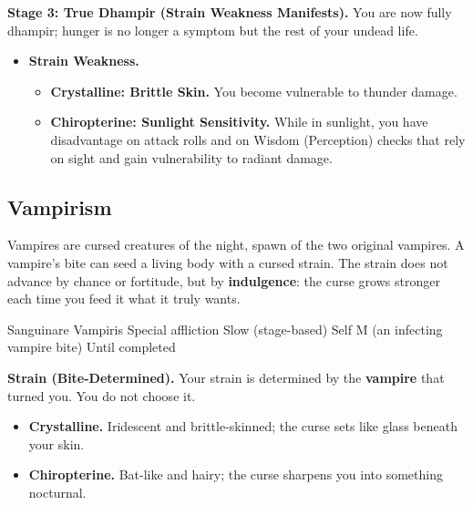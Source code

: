 \textbf{Stage 3: True Dhampir (Strain Weakness Manifests).}
You are now fully dhampir; hunger is no longer a symptom but the rest of your undead life.
\begin{itemize}
\item \textbf{Strain Weakness.}
\begin{itemize}
\item \textbf{Crystalline: Brittle Skin.} You become vulnerable to thunder damage.
\item \textbf{Chiropterine: Sunlight Sensitivity.} While in sunlight, you have disadvantage on attack rolls and on Wisdom (Perception) checks that rely on sight and gain vulnerability to radiant damage.
\end{itemize}
\end{itemize}

\subsection{Vampirism}

Vampires are cursed creatures of the night, spawn of the two original vampires. A vampire's bite can seed a living body with a cursed strain. The strain does not advance by chance or fortitude, but by \textbf{indulgence}: the curse grows stronger each time you feed it what it truly wants.

\DndSpellHeader%
  {Sanguinare Vampiris}
  {Special affliction}
  {Slow (stage-based)}
  {Self}
  {M (an infecting vampire bite)}
  {Until completed}

\textbf{Strain (Bite-Determined).} Your strain is determined by the \textbf{vampire} that turned you. You do not choose it.
\begin{itemize}
\item \textbf{Crystalline.} Iridescent and brittle-skinned; the curse sets like glass beneath your skin.
\item \textbf{Chiropterine.} Bat-like and hairy; the curse sharpens you into something nocturnal.
\end{itemize}


